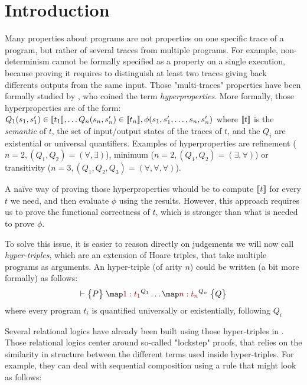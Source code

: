 \section{Introduction}
\label{sec:intro}

Many properties about programs are not properties on one specific trace of a program, but rather of several traces from multiple programs. For example, non-determinism cannot be formally specified as a property on a single execution, because proving it requires to distinguish at least two traces giving back differents outputs from the same input. Those "multi-traces" properties have been formally studied by \citet{ClarksonS08}, who coined the term \emph{hyperproperties}.
More formally, those hyperproperties are of the form:
\(
    Q_1 (s_1, s'_1) \in \sem{t_1},
    \dots
    Q_n (s_n, s'_n) \in \sem{t_n},
    \phi(s_1, s'_1, \dots, s_n, s'_n)
\)
where $\sem{t}$ is the \emph{semantic} of $t$, \ie the set of input/output states of the traces of $t$, and the $Q_i$ are existential or universal quantifiers. Examples of hyperproperties are refinement ($n = 2, (Q_1, Q_2) = (\forall, \exists)$), minimum ($n = 2, (Q_1, Q_2) = (\exists, \forall)$) or transitivity ($n = 3, (Q_1, Q_2, Q_3) = (\forall, \forall, \forall)$).

A naïve way of proving those hyperproperties whould be to compute $\sem{t}$ for every $t$ we need, and then evaluate $\phi$ using the results. However, this approach requires us to prove the functional correctness of $t$, which is stronger than what is needed to prove $\phi$.

To solve this issue, it is easier to reason directly on judgements we will now call \emph{hyper-triples}, which are an extension of Hoare triples, that take multiple programs as arguments. An hyper-triple (of arity $n$) could be written (a bit more formally) as follows:
\[
    \J |- {P} {\m[\I 1: t_1]^{Q_1} \dots \m[\I n: t_n]^{Q_n}} {Q}    
\]
where every program $t_i$ is quantified universally or existentially, following $Q_i$

Several relational logics have already been built using those hyper-triples in \cite{Yang07, SousaD16, Benton04, BartheCK16}. Those relational logics center around so-called "lockstep" proofs, that relies on the similarity in structure between the different terms used inside hyper-triples. For example, they can deal with sequential composition using a rule that might look as follows:

\begin{prooftree}
\end{prooftree}

